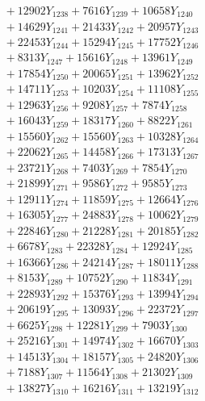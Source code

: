 \documentclass[a4paper,10pt]{article}
\begin{document}
{\begin{align}
&\;  + 12902 Y_{1238} + 7616 Y_{1239} + 10658 Y_{1240} \\[0.3ex]
&\;  + 14629 Y_{1241} + 21433 Y_{1242} + 20957 Y_{1243} \\[0.3ex]
&\;  + 22453 Y_{1244} + 15294 Y_{1245} + 17752 Y_{1246} \\[0.3ex]
&\;  + 8313 Y_{1247} + 15616 Y_{1248} + 13961 Y_{1249} \\[0.3ex]
&\;  + 17854 Y_{1250} + 20065 Y_{1251} + 13962 Y_{1252} \\[0.3ex]
&\;  + 14711 Y_{1253} + 10203 Y_{1254} + 11108 Y_{1255} \\[0.3ex]
&\;  + 12963 Y_{1256} + 9208 Y_{1257} + 7874 Y_{1258} \\[0.5ex]\allowbreak
&\;  + 16043 Y_{1259} + 18317 Y_{1260} + 8822 Y_{1261} \\[0.3ex]
&\;  + 15560 Y_{1262} + 15560 Y_{1263} + 10328 Y_{1264} \\[0.3ex]
&\;  + 22062 Y_{1265} + 14458 Y_{1266} + 17313 Y_{1267} \\[0.3ex]
&\;  + 23721 Y_{1268} + 7403 Y_{1269} + 7854 Y_{1270} \\[0.3ex]
&\;  + 21899 Y_{1271} + 9586 Y_{1272} + 9585 Y_{1273} \\[0.3ex]
&\;  + 12911 Y_{1274} + 11859 Y_{1275} + 12664 Y_{1276} \\[0.3ex]
&\;  + 16305 Y_{1277} + 24883 Y_{1278} + 10062 Y_{1279} \\[0.3ex]
&\;  + 22846 Y_{1280} + 21228 Y_{1281} + 20185 Y_{1282} \\[0.3ex]
&\;  + 6678 Y_{1283} + 22328 Y_{1284} + 12924 Y_{1285} \\[0.3ex]
&\;  + 16366 Y_{1286} + 24214 Y_{1287} + 18011 Y_{1288} \\[0.5ex]\allowbreak
&\;  + 8153 Y_{1289} + 10752 Y_{1290} + 11834 Y_{1291} \\[0.3ex]
&\;  + 22893 Y_{1292} + 15376 Y_{1293} + 13994 Y_{1294} \\[0.3ex]
&\;  + 20619 Y_{1295} + 13093 Y_{1296} + 22372 Y_{1297} \\[0.3ex]
&\;  + 6625 Y_{1298} + 12281 Y_{1299} + 7903 Y_{1300} \\[0.3ex]
&\;  + 25216 Y_{1301} + 14974 Y_{1302} + 16670 Y_{1303} \\[0.3ex]
&\;  + 14513 Y_{1304} + 18157 Y_{1305} + 24820 Y_{1306} \\[0.3ex]
&\;  + 7188 Y_{1307} + 11564 Y_{1308} + 21302 Y_{1309} \\[0.3ex]
&\;  + 13827 Y_{1310} + 16216 Y_{1311} + 13219 Y_{1312} \\[0.3ex]

\end{align}}
\end{document}
